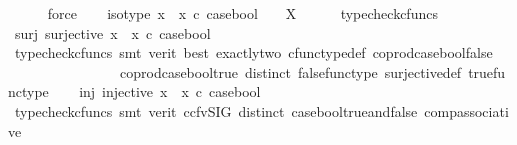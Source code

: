 \begin{isabellebody}
\ \ \ \ \isamarkupfalse%
\ force\isanewline
\ \ \isamarkupfalse%
\ iso{\isacharunderscore}{\kern0pt}type{\isacharcolon}{\kern0pt}\ {\isachardoublequoteopen}{\isacharparenleft}{\kern0pt}{\isacharparenleft}{\kern0pt}x{}\ {\isasymamalg}\ x{}{\isacharparenright}{\kern0pt}\ {\isasymcirc}\isactrlsub c\ case{\isacharunderscore}{\kern0pt}bool{\isacharparenright}{\kern0pt}\ {\isacharcolon}{\kern0pt}\ {\isasymOmega}\ {\isasymrightarrow}\ X{\isachardoublequoteclose}\isanewline
\ \ \ \ \isamarkupfalse%
\ typecheck{\isacharunderscore}{\kern0pt}cfuncs\isanewline
\ \ \isamarkupfalse%
\ surj{\isacharcolon}{\kern0pt}\ {\isachardoublequoteopen}surjective\ {\isacharparenleft}{\kern0pt}{\isacharparenleft}{\kern0pt}x{}\ {\isasymamalg}\ x{}{\isacharparenright}{\kern0pt}\ {\isasymcirc}\isactrlsub c\ case{\isacharunderscore}{\kern0pt}bool{\isacharparenright}{\kern0pt}{\isachardoublequoteclose}\isanewline
\ \ \ \ \isamarkupfalse%
\ {\isacharparenleft}{\kern0pt}typecheck{\isacharunderscore}{\kern0pt}cfuncs{\isacharcomma}{\kern0pt}\ smt\ {\isacharparenleft}{\kern0pt}verit{\isacharcomma}{\kern0pt}\ best{\isacharparenright}{\kern0pt}\ exactly{\isacharunderscore}{\kern0pt}two\ cfunc{\isacharunderscore}{\kern0pt}type{\isacharunderscore}{\kern0pt}def\ coprod{\isacharunderscore}{\kern0pt}case{\isacharunderscore}{\kern0pt}bool{\isacharunderscore}{\kern0pt}false\isanewline
\ \ \ \ \ \ \ \ \ \ \ \ \ \ \ \ coprod{\isacharunderscore}{\kern0pt}case{\isacharunderscore}{\kern0pt}bool{\isacharunderscore}{\kern0pt}true\ distinct\ false{\isacharunderscore}{\kern0pt}func{\isacharunderscore}{\kern0pt}type\ surjective{\isacharunderscore}{\kern0pt}def\ true{\isacharunderscore}{\kern0pt}func{\isacharunderscore}{\kern0pt}type{\isacharparenright}{\kern0pt}\isanewline
\ \ \isamarkupfalse%
\ inj{\isacharcolon}{\kern0pt}\ {\isachardoublequoteopen}injective\ {\isacharparenleft}{\kern0pt}{\isacharparenleft}{\kern0pt}x{}\ {\isasymamalg}\ x{}{\isacharparenright}{\kern0pt}\ {\isasymcirc}\isactrlsub c\ case{\isacharunderscore}{\kern0pt}bool{\isacharparenright}{\kern0pt}{\isachardoublequoteclose}\isanewline
\ \ \ \ \isamarkupfalse%
\ {\isacharparenleft}{\kern0pt}typecheck{\isacharunderscore}{\kern0pt}cfuncs{\isacharcomma}{\kern0pt}\ smt\ {\isacharparenleft}{\kern0pt}verit{\isacharcomma}{\kern0pt}\ ccfv{\isacharunderscore}{\kern0pt}SIG{\isacharparenright}{\kern0pt}\ distinct\ case{\isacharunderscore}{\kern0pt}bool{\isacharunderscore}{\kern0pt}true{\isacharunderscore}{\kern0pt}and{\isacharunderscore}{\kern0pt}false\ comp{\isacharunderscore}{\kern0pt}associative{}\ \isanewline

\end{isabellebody}
